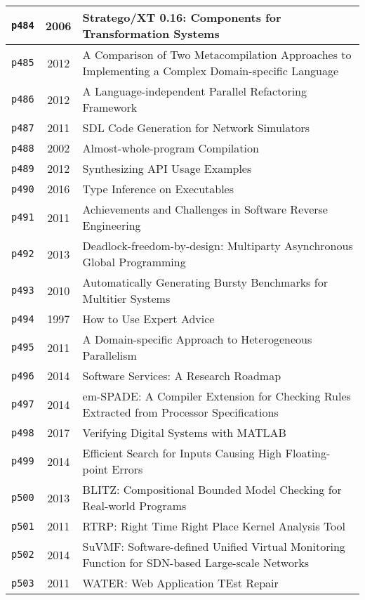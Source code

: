 \begin{longtable}{| c | c | p{16cm} |}
  \hline
  \texttt{p484} & 2006 & Stratego/XT 0.16: Components for Transformation Systems \\
  \hline
  \texttt{p485} & 2012 & A Comparison of Two Metacompilation Approaches to Implementing a Complex Domain-specific Language \\
  \hline
  \texttt{p486} & 2012 & A Language-independent Parallel Refactoring Framework \\
  \hline
  \texttt{p487} & 2011 & SDL Code Generation for Network Simulators \\
  \hline
  \texttt{p488} & 2002 & Almost-whole-program Compilation \\
  \hline
  \texttt{p489} & 2012 & Synthesizing API Usage Examples \\
  \hline
  \texttt{p490} & 2016 & Type Inference on Executables \\
  \hline
  \texttt{p491} & 2011 & Achievements and Challenges in Software Reverse Engineering \\
  \hline
  \texttt{p492} & 2013 & Deadlock-freedom-by-design: Multiparty Asynchronous Global Programming \\
  \hline
  \texttt{p493} & 2010 & Automatically Generating Bursty Benchmarks for Multitier Systems \\
  \hline
  \texttt{p494} & 1997 & How to Use Expert Advice \\
  \hline
  \texttt{p495} & 2011 & A Domain-specific Approach to Heterogeneous Parallelism \\
  \hline
  \texttt{p496} & 2014 & Software Services: A Research Roadmap \\
  \hline
  \texttt{p497} & 2014 & em-SPADE: A Compiler Extension for Checking Rules Extracted from Processor Specifications \\
  \hline
  \texttt{p498} & 2017 & Verifying Digital Systems with MATLAB \\
  \hline
  \texttt{p499} & 2014 & Efficient Search for Inputs Causing High Floating-point Errors \\
  \hline
  \texttt{p500} & 2013 & BLITZ: Compositional Bounded Model Checking for Real-world Programs \\
  \hline
  \texttt{p501} & 2011 & RTRP: Right Time Right Place Kernel Analysis Tool \\
  \hline
  \texttt{p502} & 2014 & SuVMF: Software-defined Unified Virtual Monitoring Function for SDN-based Large-scale Networks \\
  \hline
  \texttt{p503} & 2011 & WATER: Web Application TEst Repair \\

\end{longtable}

